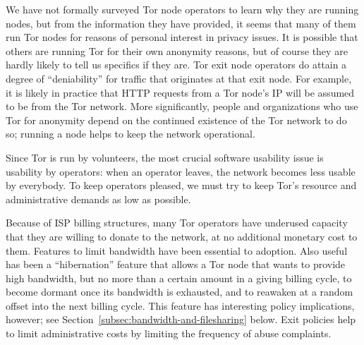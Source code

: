 \documentclass{llncs}
\begin{document}
We have not formally surveyed Tor node operators to learn why they are
running nodes, but
from the information they have provided, it seems that many of them run Tor
nodes for reasons of personal interest in privacy issues.  It is possible
that others are running Tor for their own
anonymity reasons, but of course they are
hardly likely to tell us specifics if they are.
%
Tor exit node operators do attain a degree of
``deniability'' for traffic that originates at that exit node.  For
  example, it is likely in practice that HTTP requests from a Tor node's IP
  will be assumed to be from the Tor network. 
  More significantly, people and organizations who use Tor for
  anonymity depend on the
  continued existence of the Tor network to do so; running a node helps to
  keep the network operational.


Since Tor is run by volunteers, the most crucial software usability issue is
usability by operators: when an operator leaves, the network becomes less
usable by everybody.  To keep operators pleased, we must try to keep Tor's
resource and administrative demands as low as possible.

Because of ISP billing structures, many Tor operators have underused capacity
that they are willing to donate to the network, at no additional monetary
cost to them.  Features to limit bandwidth have been essential to adoption.
Also useful has been a ``hibernation'' feature that allows a Tor node that
wants to provide high bandwidth, but no more than a certain amount in a
giving billing cycle, to become dormant once its bandwidth is exhausted, and
to reawaken at a random offset into the next billing cycle.  This feature has
interesting policy implications, however; see
Section~\ref{subsec:bandwidth-and-filesharing} below.
Exit policies help to limit administrative costs by limiting the frequency of
abuse complaints.
\end{document}
